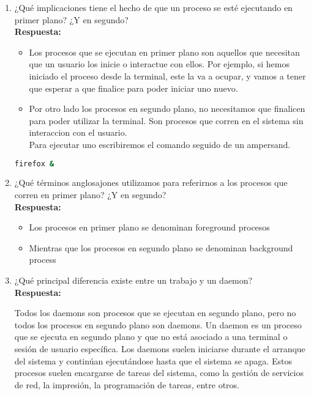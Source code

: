 \documentclass[a4paper,12pt]{article}
\begin{document}
\begin{enumerate}[label=\textbf{Pregunta \arabic*.}]
    \newpage

    \item ¿Qué implicaciones tiene el hecho de que un proceso se esté ejecutando en primer plano? ¿Y en segundo? \\ %
    \textbf{Respuesta:} 
    \begin{itemize}
        \item Los procesos que se ejecutan en primer plano son aquellos que necesitan que un usuario los inicie o interactue con ellos. Por ejemplo, si hemos iniciado el proceso desde la terminal, este la va a ocupar, y vamos a tener que esperar a que finalice para poder iniciar uno nuevo.
        \item Por otro lado los procesos en segundo plano, no necesitamos que finalicen para poder utilizar la terminal. Son procesos que corren en el sistema sin interaccion con el usuario. \\
        Para ejecutar uno escribiremos el comando seguido de un ampersand.
    \end{itemize}
    
    \begin{lstlisting}[language=bash]
        firefox &
\end{lstlisting}


    \item ¿Qué términos anglosajones utilizamos para referirnos a los procesos que corren en primer plano? ¿Y en segundo? \\
    \textbf{Respuesta:} 
    \begin{itemize}
        \item Los procesos en primer plano se denominan foreground procesos
        \item Mientras que los procesos en segundo plano se denominan background process
    \end{itemize}

    \item ¿Qué principal diferencia existe entre un trabajo y un daemon? \\ %
    \textbf{Respuesta:} 
    
    Todos los daemons son procesos que se ejecutan en segundo plano, pero no todos los procesos en segundo plano son daemons. Un daemon es un proceso que se ejecuta en segundo plano y que no está asociado a una terminal o sesión de usuario específica. Los daemons suelen iniciarse durante el arranque del sistema y continúan ejecutándose hasta que el sistema se apaga. Estos procesos suelen encargarse de tareas del sistema, como la gestión de servicios de red, la impresión, la programación de tareas, entre otros.



\end{enumerate}
\end{document}
